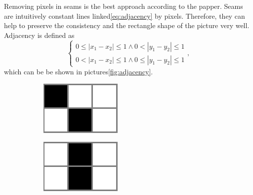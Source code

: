 \documentclass[final]{cvpr}
\begin{document}
Removing pixels in seams is the best approach according to the papper\cite{avidan2007seam}.
Seams are intuitively constant lines linked\ref{eq:adjacency} by pixels.
Therefore, they can help to preserve the consistency and the rectangle shape of the picture very well.
Adjacency is defined as
\begin{equation}
    \begin{cases}
        0\le|x_1-x_2|\le1\wedge0<|y_1-y_2|\le1\\
        0<|x_1-x_2|\le1\wedge0\le|y_1-y_2|\le1
    \end{cases},
    \label{eq:adjacency}
\end{equation}
which can be be shown in pictures\ref{fig:adjacency}.
\begin{figure}[htb]
\begin{center}
\begin{subfigure}[b]{0.30\linewidth}
    \includegraphics[width=\textwidth]{to_right.png}
\end{subfigure}
\begin{subfigure}[b]{0.30\linewidth}
    \includegraphics[width=\textwidth]{straight.png}

\end{subfigure}
\end{center}
\end{figure}
\end{document}

